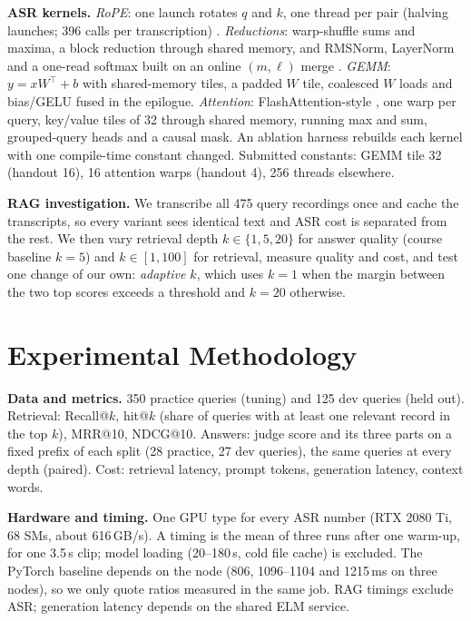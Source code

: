 \documentclass{article}
\begin{document}
\textbf{ASR kernels.} \emph{RoPE}: one launch rotates $q$ and $k$, one thread per pair (halving launches; 396 calls per transcription) \citep{su2024roformer}. \emph{Reductions}: warp-shuffle sums and maxima, a block reduction through shared memory, and RMSNorm, LayerNorm and a one-read softmax built on an online $(m,\ell)$ merge \citep{milakov2018online}. \emph{GEMM}: $y=x W^{\top}+b$ with shared-memory tiles, a padded $W$ tile, coalesced $W$ loads and bias/GELU fused in the epilogue. \emph{Attention}: FlashAttention-style \citep{dao2022flashattention}, one warp per query, key/value tiles of 32 through shared memory, running max and sum, grouped-query heads and a causal mask. An ablation harness rebuilds each kernel with one compile-time constant changed. Submitted constants: GEMM tile 32 (handout 16), 16 attention warps (handout 4), 256 threads elsewhere.

\textbf{RAG investigation.} We transcribe all 475 query recordings once and cache the transcripts, so every variant sees identical text and ASR cost is separated from the rest. We then vary retrieval depth $k\in\{1,5,20\}$ for answer quality (course baseline $k{=}5$) and $k\in[1,100]$ for retrieval, measure quality and cost, and test one change of our own: \emph{adaptive $k$}, which uses $k{=}1$ when the margin between the two top scores exceeds a threshold and $k{=}20$ otherwise.

\section{Experimental Methodology}
\label{sec:methodology}
\textbf{Data and metrics.} 350 practice queries (tuning) and 125 dev queries (held out). Retrieval: Recall@$k$, hit@$k$ (share of queries with at least one relevant record in the top $k$), MRR@10, NDCG@10. Answers: judge score and its three parts on a fixed prefix of each split (28 practice, 27 dev queries), the same queries at every depth (paired). Cost: retrieval latency, prompt tokens, generation latency, context words.

\textbf{Hardware and timing.} One GPU type for every ASR number (RTX 2080 Ti, 68 SMs, about 616\,GB/s). A timing is the mean of three runs after one warm-up, for one 3.5\,s clip; model loading (20--180\,s, cold file cache) is excluded. The PyTorch baseline depends on the node (806, 1096--1104 and 1215\,ms on three nodes), so we only quote ratios measured in the same job. RAG timings exclude ASR; generation latency depends on the shared ELM service.
\end{document}
